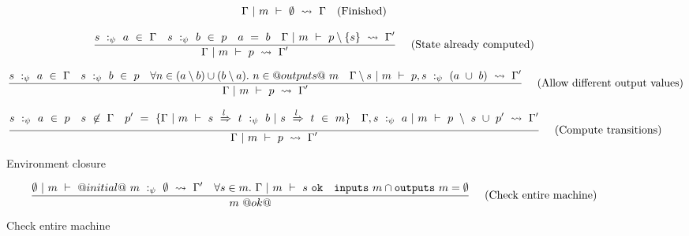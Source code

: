 \begin{figure*}

$$
\Gamma ~|~ m ~\vdash~ \emptyset ~\rightsquigarrow~ \Gamma
\quad
\textrm{(Finished)}
$$

$$
\frac {\displaystyle 
    s~:_\psi~ a ~\in~ \Gamma
    \quad
    s~:_\psi~b~\in~p
    \quad
    a~=~b
    \quad
    \Gamma ~|~ m ~\vdash~ p \setminus \{s\} ~\rightsquigarrow~ \Gamma'
} {\displaystyle 
    \Gamma ~|~ m ~\vdash~ p ~\rightsquigarrow~ \Gamma'
} \ 
\quad
\textrm{(State already computed)}
$$

$$
\frac {\displaystyle 
    s~:_\psi~ a ~\in~ \Gamma
    \quad
    s~:_\psi~b~\in~p
    \quad
    \forall n \in (a \setminus b) \cup (b \setminus a).~ n \in @outputs@~m
    \quad
    \Gamma \setminus s ~|~ m ~\vdash~ p, s~:_\psi~(a~\cup~b) ~\rightsquigarrow~ \Gamma'
} {\displaystyle 
    \Gamma ~|~ m ~\vdash~ p ~\rightsquigarrow~ \Gamma'
} \ 
\quad
\textrm{(Allow different output values)}
$$

$$
\frac {\displaystyle 
    s~:_\psi~a~\in~p
    \quad
    s~\not\in~\Gamma
    \quad
    p'~=~\{ \Gamma ~|~ m ~\vdash~ s~\xRightarrow{l}~t ~:_\psi~ b ~|~ s~\xRightarrow{l}~ t~\in~ m\}
    \quad
    \Gamma,s~:_\psi~a ~|~ m ~\vdash~ p~\setminus~s~\cup~ p'  ~\rightsquigarrow~ \Gamma'
} {\displaystyle 
    \Gamma ~|~ m ~\vdash~ p ~\rightsquigarrow~ \Gamma'
} \ 
\quad
\textrm{(Compute transitions)}
$$

\caption{Environment closure}
\label{fig:inv:closure}
\end{figure*}


\begin{figure*}

$$
\frac {\displaystyle 
    \emptyset ~|~ m ~\vdash~ @initial@~m~:_\psi~\emptyset ~\rightsquigarrow~ \Gamma'
    \quad
    \forall s \in m.\ \Gamma ~|~ m ~\vdash~ s~\mathtt{ok}
    \quad
    \mathtt{inputs}~m \cap \mathtt{outputs}~m = \emptyset
} {\displaystyle 
    m~@ok@
} \ 
\quad
\textrm{(Check entire machine)}
$$


\caption{Check entire machine}
\label{fig:inv:entire}
\end{figure*}
